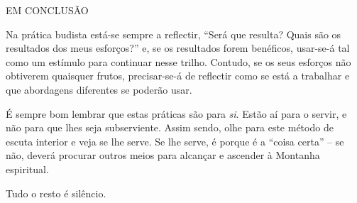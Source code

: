 EM CONCLUSÃO

Na prática budista está-se sempre a reflectir, ``Será que resulta? Quais
são os resultados dos meus esforços?'' e, se os resultados forem
benéficos, usar-se-á tal como um estímulo para continuar nesse trilho.
Contudo, se os seus esforços não obtiverem quaisquer frutos,
precisar-se-á de reflectir como se está a trabalhar e que abordagens
diferentes se poderão usar.

É sempre bom lembrar que estas práticas são para \emph{si}. Estão aí
para o servir, e não para que lhes seja subserviente. Assim sendo, olhe
para este método de escuta interior e veja se lhe serve. Se lhe serve, é
porque é a ``coisa certa'' -- se não, deverá procurar outros meios para
alcançar e ascender à Montanha espiritual.

Tudo o resto é silêncio.
